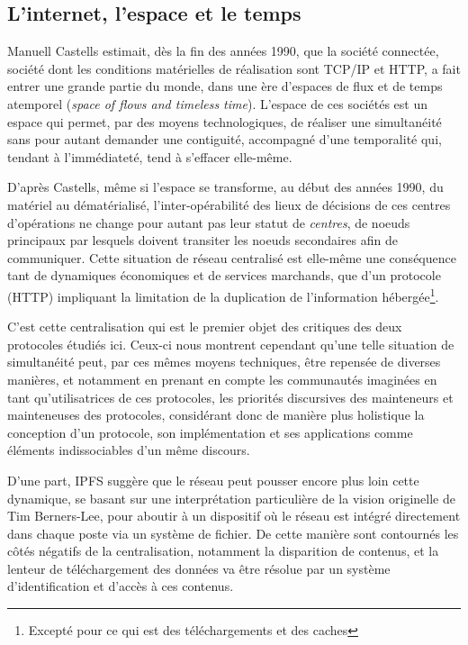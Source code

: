 \documentclass{article}
\begin{document}
\subsection{L'internet, l'espace et le temps}

Manuell Castells estimait, dès la fin des années 1990, que la société connectée, société dont les conditions matérielles de réalisation sont TCP/IP et HTTP, a fait entrer une grande partie du monde, dans une ère d'espaces de flux et de temps atemporel (\emph{space of flows and timeless time})\cite{castells_communication_2009}. L'espace de ces sociétés est un espace qui permet, par des moyens technologiques, de réaliser une simultanéité sans pour autant demander une contiguité, accompagné d'une temporalité qui, tendant à l'immédiateté, tend à s'effacer elle-même\cite{virilio_speed_2006}.

D'après Castells, même si l'espace se transforme, au début des années 1990, du matériel au dématérialisé, l'inter-opérabilité des lieux de décisions de ces centres d'opérations ne change pour autant pas leur statut de \emph{centres}, de noeuds principaux par lesquels doivent transiter les noeuds secondaires afin de communiquer. Cette situation de réseau centralisé est elle-même une conséquence tant de dynamiques économiques et de services marchands, que d'un protocole (HTTP) impliquant la limitation de la duplication de l'information hébergée\footnote{Excepté pour ce qui est des téléchargements et des caches}.

C'est cette centralisation qui est le premier objet des critiques des deux protocoles étudiés ici. Ceux-ci nous montrent cependant qu'une telle situation de simultanéité peut, par ces mêmes moyens techniques, être repensée de diverses manières, et notamment en prenant en compte les communautés imaginées en tant qu'utilisatrices de ces protocoles, les priorités discursives des mainteneurs et mainteneuses des protocoles, considérant donc de manière plus holistique la conception d'un protocole, son implémentation et ses applications comme éléments indissociables d'un même discours.

D'une part, IPFS suggère que le réseau peut pousser encore plus loin cette dynamique, se basant sur une interprétation particulière de la vision originelle de Tim Berners-Lee, pour aboutir à un dispositif où le réseau est intégré directement dans chaque poste via un système de fichier. De cette manière sont contournés les côtés négatifs de la centralisation, notamment la disparition de contenus, et la lenteur de téléchargement des données va être résolue par un système d'identification et d'accès à ces contenus.
\end{document}
